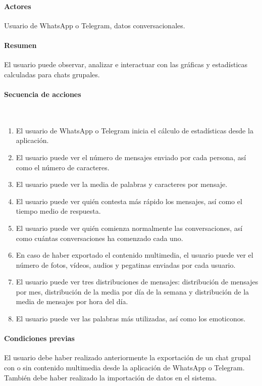 \paragraph{Actores} Usuario de WhatsApp o Telegram, datos conversacionales.
\paragraph{Resumen} El usuario puede observar, analizar e interactuar con las gráficas y estadísticas calculadas para chats grupales.
\paragraph{Secuencia de acciones}\mbox{}\\

\begin{enumerate}
	\item El usuario de WhatsApp o Telegram inicia el cálculo de estadísticas desde la aplicación.
	\item El usuario puede ver el número de mensajes enviado por cada persona, así como el número de caracteres.
	\item El usuario puede ver la media de palabras y caracteres por mensaje.
	\item El usuario puede ver quién contesta más rápido los mensajes, así como el tiempo medio de respuesta.
	\item El usuario puede ver quién comienza normalmente las conversaciones, así como cuántas conversaciones ha comenzado cada uno.
	\item En caso de haber exportado el contenido multimedia, el usuario puede ver el número de fotos, vídeos, audios y pegatinas enviadas por cada usuario.
	\item El usuario puede ver tres distribuciones de mensajes: distribución de mensajes por mes, distribución de la media por día de la semana y distribución de la media de mensajes por hora del día.
	\item El usuario puede ver las palabras más utilizadas, así como los emoticonos.
\end{enumerate}

\paragraph{Condiciones previas} El usuario debe haber realizado anteriormente la exportación de un chat grupal con o sin contenido multimedia desde la aplicación de WhatsApp o Telegram. También debe haber realizado la importación de datos en el sistema.

